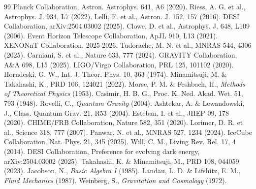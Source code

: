 \documentclass[12pt, a4paper]{article}
\begin{document}
\begin{thebibliography}{99}
 Planck Collaboration, Astron. Astrophys. 641, A6 (2020).
 Riess, A. G. et al., Astrophys. J. 934, L7 (2022).
 Lelli, F. et al., Astron. J. 152, 157 (2016).
 DESI Collaboration, arXiv:2504.03002 (2025).
 Clowe, D. et al., Astrophys. J. 648, L109 (2006).
 Event Horizon Telescope Collaboration, ApJL 910, L13 (2021).
 XENONnT Collaboration, 2025-2026.
 Tudorache, M. N. et al., MNRAS 544, 4306 (2025).
 Carniani, S. et al., Nature 633, 777 (2024).
 GRAVITY Collaboration, A\&A 698, L15 (2025).
 LIGO/Virgo Collaboration, PRL 125, 101102 (2020).
 Horndeski, G. W., Int. J. Theor. Phys. 10, 363 (1974).
 Minamitsuji, M. \& Takahashi, K., PRD 106, 124021 (2022).
 Morse, P. M. \& Feshbach, H., \textit{Methods of Theoretical Physics} (1953).
 Casimir, H. B. G., Proc. K. Ned. Akad. Wet. 51, 793 (1948).
 Rovelli, C., \textit{Quantum Gravity} (2004).
 Ashtekar, A. \& Lewandowski, J., Class. Quantum Grav. 21, R53 (2004).
 Esteban, I. et al., JHEP 09, 178 (2020).
 CHIME/FRB Collaboration, Nature 582, 351 (2020).
 Lorimer, D. R. et al., Science 318, 777 (2007).
 Panwar, N. et al., MNRAS 527, 1234 (2024).
 IceCube Collaboration, Nat. Phys. 21, 345 (2025).
 Will, C. M., Living Rev. Rel. 17, 4 (2014).
 DESI Collaboration, Preference for evolving dark energy, arXiv:2504.03002 (2025).
 Takahashi, K. \& Minamitsuji, M., PRD 108, 044059 (2023).
 Jacobson, N., \textit{Basic Algebra I} (1985).
 Landau, L. D. \& Lifshitz, E. M., \textit{Fluid Mechanics} (1987).
 Weinberg, S., \textit{Gravitation and Cosmology} (1972).
\end{thebibliography}
\end{document}
